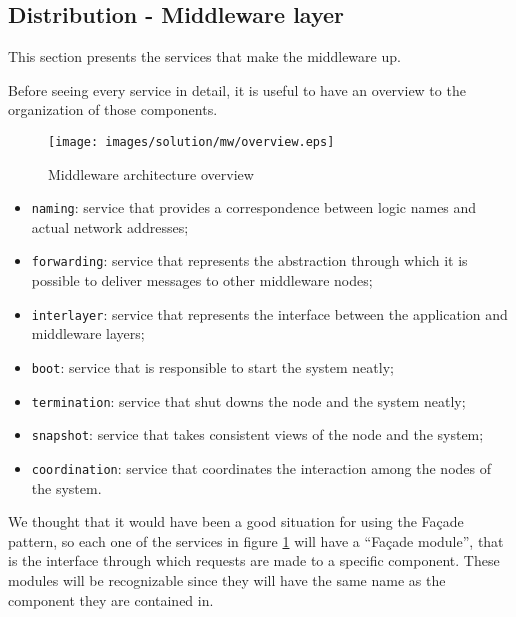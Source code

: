 \subsection{Distribution - Middleware layer}
This section presents the services that make the middleware up.

Before seeing every service in detail, it is useful to have an overview to the
organization of those components.

\begin{figure}[H]
  \centering
  \texttt{[image: images/solution/mw/overview.eps]}
  \caption{Middleware architecture overview}
  \label{fig:mw-arch-over}
\end{figure}

\begin{itemize}
  \item \texttt{naming}: service that provides a correspondence between logic
    names and actual network addresses;
  \item \texttt{forwarding}: service that represents the abstraction through
    which it is possible to deliver messages to other middleware nodes;
  \item \texttt{interlayer}: service that represents the interface between
    the application and middleware layers;
  \item \texttt{boot}: service that is responsible to start the system neatly;
  \item \texttt{termination}: service that shut downs the node and the system
    neatly;
  \item \texttt{snapshot}: service that takes consistent views of the node and
    the system;
  \item \texttt{coordination}: service that coordinates the interaction among
    the nodes of the system.
\end{itemize}

We thought that it would have been a good situation for using the Fa\c cade
pattern, so each one of the services in figure \ref{fig:mw-arch-over} will have
a ``Fa\c cade module'', that is the interface through which requests are made
to a specific component.
These modules will be recognizable since they will have the same name as the
component they are contained in.








